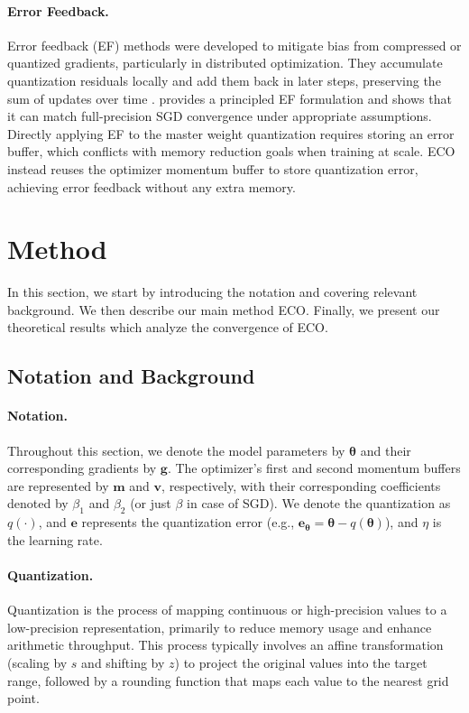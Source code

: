 \documentclass[11pt, a4paper, onecolumn, copyright, goog]{google}
\newcommand{\methodname}{ECO}
\newcommand{\vect}[1]{\mathbf{#1}}
\newcommand{\vtheta}{\boldsymbol{\theta}}
\newcommand{\vg}{\vect{g}}
\newcommand{\vm}{\vect{m}}
\newcommand{\vvv}{\vect{v}}
\newcommand{\ve}{\vect{e}}
\newcommand{\qfn}{\textit{q}}
\theoremstyle{plain}
\theoremstyle{definition}
\theoremstyle{remark}
\begin{document}
\paragraph{Error Feedback.}
Error feedback (EF) methods were developed to mitigate bias from compressed or quantized gradients, particularly in distributed optimization. They accumulate quantization residuals locally and add them back in later steps, preserving the sum of updates over time \citep{onebitsgd,onebitadam,zeropp,ef21}. \citet{ef21} provides a principled EF formulation and shows that it can match full-precision SGD convergence under appropriate assumptions. Directly applying EF to the master weight quantization requires storing an error buffer, which conflicts with memory reduction goals when training at scale. \methodname{} instead reuses the optimizer momentum buffer to store quantization error, achieving error feedback without any extra memory.

\section{Method}
In this section, we start by introducing the notation and covering relevant background. We then describe our main method \methodname{}. Finally, we present our theoretical results which analyze the convergence of \methodname{}.

\subsection{Notation and Background}
\paragraph{Notation.}
\label{sec:notation}
Throughout this section, we denote the model parameters by $\vtheta$ and their corresponding gradients by $\vg$.
The optimizer's first and second momentum buffers are represented by $\vm$ and $\vvv$, respectively, with their corresponding coefficients denoted by $\beta_1$ and $\beta_2$ (or just $\beta$ in case of SGD).
We denote the quantization as $\qfn(\cdot)$, and $\ve$ represents the quantization error (e.g., $\ve_{\vtheta} = \vtheta - \qfn(\vtheta)$), and $\eta$ is the learning rate.

\paragraph{Quantization.}
Quantization is the process of mapping continuous or high-precision values to a low-precision representation, primarily to reduce memory usage and enhance arithmetic throughput. This process typically involves an affine transformation (scaling by $s$ and shifting by $z$) to project the original values into the target range, followed by a rounding function that maps each value to the nearest grid point.
\end{document}
